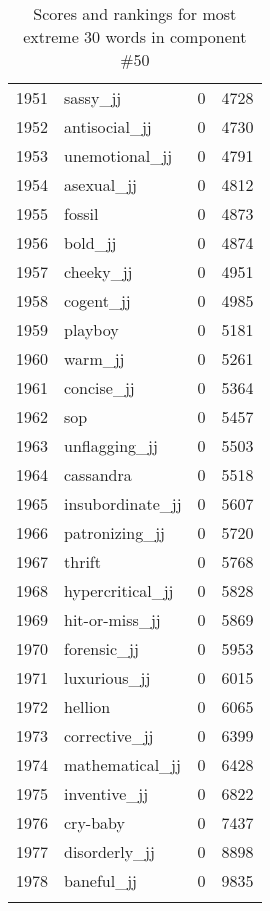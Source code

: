 \begin{longtable}[!htbp]{| rlr@{.}l |}
    1951 & sassy\_jj & 0 & 4728 \\
    1952 & antisocial\_jj & 0 & 4730 \\
    1953 & unemotional\_jj & 0 & 4791 \\
    1954 & asexual\_jj & 0 & 4812 \\
    1955 & fossil & 0 & 4873 \\
    1956 & bold\_jj & 0 & 4874 \\
    1957 & cheeky\_jj & 0 & 4951 \\
    1958 & cogent\_jj & 0 & 4985 \\
    1959 & playboy & 0 & 5181 \\
    1960 & warm\_jj & 0 & 5261 \\
    1961 & concise\_jj & 0 & 5364 \\
    1962 & sop & 0 & 5457 \\
    1963 & unflagging\_jj & 0 & 5503 \\
    1964 & cassandra & 0 & 5518 \\
    1965 & insubordinate\_jj & 0 & 5607 \\
    1966 & patronizing\_jj & 0 & 5720 \\
    1967 & thrift & 0 & 5768 \\
    1968 & hypercritical\_jj & 0 & 5828 \\
    1969 & hit-or-miss\_jj & 0 & 5869 \\
    1970 & forensic\_jj & 0 & 5953 \\
    1971 & luxurious\_jj & 0 & 6015 \\
    1972 & hellion & 0 & 6065 \\
    1973 & corrective\_jj & 0 & 6399 \\
    1974 & mathematical\_jj & 0 & 6428 \\
    1975 & inventive\_jj & 0 & 6822 \\
    1976 & cry-baby & 0 & 7437 \\
    1977 & disorderly\_jj & 0 & 8898 \\
    1978 & baneful\_jj & 0 & 9835 \\
    \hline
    \caption{Scores and rankings for most extreme 30 words in component \#50} \\
\end{longtable}

